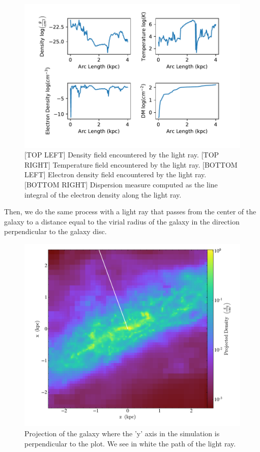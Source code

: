\documentclass{article}
\begin{document}
\begin{figure}[h]
\begin{center}
\includegraphics[width = 0.7\columnwidth]{ray_parr_subplots.pdf}
\caption{[TOP LEFT] Density field encountered by the light ray. [TOP RIGHT] Temperature field encountered by the light ray. [BOTTOM LEFT] Electron density field encountered by the light ray. [BOTTOM RIGHT] Dispersion measure computed as the line integral of the electron density along the light ray.}
\label{parsubplots}
\end{center}
\end{figure}
\newpage


Then, we do the same process with a light ray that passes from the center of the galaxy to a distance equal to the virial radius of the galaxy in the direction perpendicular to the galaxy disc.

\begin{figure}[h]
\begin{center}
  \includegraphics[width = 0.4\columnwidth]{ray_perp_galaxy_y}
\caption{Projection of the galaxy where the 'y' axis in the simulation is perpendicular to the plot. We see in white the path of the light ray.}
\label{galaxyperp}
\end{center}
\end{figure}
\end{document}
